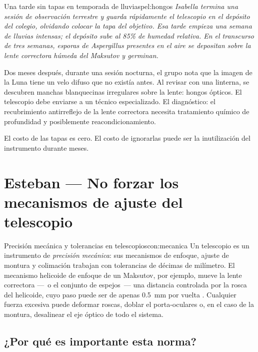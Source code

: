 \documentclass[12pt,oneside]{book}
\begin{document}
\begin{peligro}{Una tarde sin tapas en temporada de lluvias}{pel:hongos}
    \itshape
    Isabella termina una sesión de observación terrestre y guarda rápidamente el
    telescopio en el depósito del colegio, olvidando colocar la tapa del objetivo.
    Esa tarde empieza una semana de lluvias intensas; el depósito sube al 85\% de
    humedad relativa. En el transcurso de tres semanas, esporas de \textit{Aspergillus}
    presentes en el aire se depositan sobre la lente correctora húmeda del Maksutov
    y germinan.

    Dos meses después, durante una sesión nocturna, el grupo nota que la imagen de
    la Luna tiene un velo difuso que no existía antes. Al revisar con una linterna,
    se descubren manchas blanquecinas irregulares sobre la lente: hongos ópticos.
    El telescopio debe enviarse a un técnico especializado. El diagnóstico: el
    recubrimiento antirreflejo de la lente correctora necesita tratamiento químico
    de profundidad y posiblemente reacondicionamiento.

    \medskip
    \normalfont
    El costo de las tapas es cero. El costo de ignorarlas puede ser la inutilización
    del instrumento durante meses. \cite{rutten1988,cloudy2019}
\end{peligro}

\section{Esteban — No forzar los mecanismos de ajuste del telescopio}

\begin{concepto}{Precisión mecánica y tolerancias en telescopios}{con:mecanica}
    Un telescopio es un instrumento de \emph{precisión mecánica}: sus mecanismos
    de enfoque, ajuste de montura y colimación trabajan con tolerancias de décimas
    de milímetro. El mecanismo helicoide de enfoque de un Maksutov, por ejemplo,
    mueve la lente correctora —~o el conjunto de espejos~— una distancia controlada
    por la rosca del helicoide, cuyo paso puede ser de apenas 0.5~mm por vuelta
    \cite{tonkin2007}. Cualquier fuerza excesiva puede deformar roscas, doblar
    el porta-oculares o, en el caso de la montura, desalinear el eje óptico de
    todo el sistema.
\end{concepto}

\subsection{¿Por qué es importante esta norma?}
\end{document}
